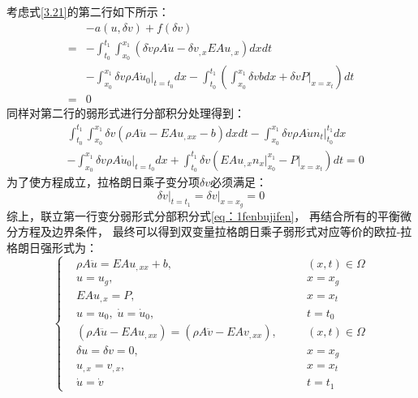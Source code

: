 考虑式\eqref{3.21}的第二行如下所示：
\begin{equation}
    \begin{aligned}
        &- a(u, \delta v) + f(\delta v) \\
        =&-\int_{t_0}^{t_1}\int_{x_0}^{x_1} (\delta\dot{v}\rho A\dot{u} - \delta v_{,x}EA u_{,x}) dx dt \\
        &-\int_{x_0}^{x_1} \delta v \rho A \dot u_0 \vert_{t=t_0} dx
        -\int_{t_0}^{t_1} \left( \int_{x_0}^{x_1} \delta v b dx + \delta v P \vert_{x=x_t} \right) dt \\ 
        =& 0
    \end{aligned}
\end{equation}
同样对第二行的弱形式进行分部积分处理得到：
\begin{equation}
    \begin{aligned}
        & \int_{t_0}^{t_1}\int_{x_0}^{x_1} \delta v (\rho A \ddot{u} - EA u_{,xx} - b) dx dt 
        - \int_{x_0}^{x_1} \delta v \rho A \dot{u} n_t \big|_{t_0}^{t_1} dx \\
        & - \int_{x_0}^{x_1} \delta v \rho A \dot u_0 \vert_{t=t_0} dx 
         + \int_{t_0}^{t_1} \delta v \left( EA u_{,x} n_x \big|_{x_0}^{x_1} - P \vert_{x=x_t} \right) dt = 0
    \end{aligned}
\end{equation}
为了使方程成立，拉格朗日乘子变分项$\delta v$必须满足：
\begin{equation}\label{eq:delatv}
    \delta v \vert_{t=t_1} = \delta v \vert_{x=x_g} = 0
\end{equation}
综上，联立第一行变分弱形式分部积分式\eqref{eq：1fenbujifen}，
再结合所有的平衡微分方程及边界条件，
最终可以得到双变量拉格朗日乘子弱形式对应等价的欧拉-拉格朗日强形式为：
\begin{equation}\label{2ddengjia}
    \left \{
        \begin{aligned}
            &\rho A \ddot{u} = EA u_{,xx} + b,  \quad &&(x,t) \in \Omega \\
            &u = u_g, \quad &&x = x_g \;  \\
            &EA u_{,x}  = P, \quad &&x = x_t \;  \\
            &u = u_0, \; \dot u= \dot u_0, && t=t_0 \;  \\
            &(\rho A \ddot{u} - EA u_{,xx}) = (\rho A \ddot{v} - EA v_{,xx}), \quad &&(x,t) \in \Omega \\
            &\delta u = \delta v = 0, \quad &&x = x_g \;  \\
            &u_{,x} = v_{,x}, \quad &&x = x_t \;  \\
            &\dot{u} = \dot{v} && t=t_1 
        \end{aligned}
    \right .
\end{equation}

